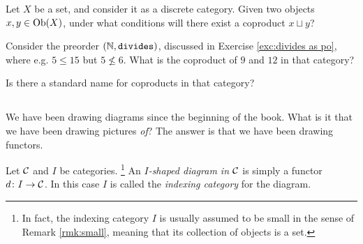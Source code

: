 \documentclass[CT4S-EN-RU]{subfiles}
\begin{document}
\begin{exerciseRUS}
\end{exerciseRUS}

\begin{exerciseENG}
Let $X$ be a set, and consider it as a discrete category. Given two objects $x,y\in\textnormal{Ob}(X)$, under what conditions will there exist a coproduct $x\sqcup y$?
\end{exerciseENG}

\begin{exerciseRUS}
\end{exerciseRUS}

\begin{exerciseENG}
Consider the preorder $({\mathbb N},{\tt divides})$, discussed in Exercise \ref{exc:divides as po}, where e.g. $5\leq 15$ but $5\not\leq 6$. \sexc What is the coproduct of $9$ and $12$ in that category?
\item Is there a standard name for coproducts in that category?
\endsexc
\end{exerciseENG}

\begin{exerciseRUS}
\end{exerciseRUS}


\subsection{}\label{sec:diagrams in a category}

\begin{blockENG}
We have been drawing diagrams since the beginning of the book. What is it that we have been drawing pictures {\em of}? The answer is that we have been drawing functors.
\end{blockENG}

\begin{blockRUS}
\end{blockRUS}

\begin{definition}
Let $\mathcal{C}$ and $I$ be categories.
\footnote{In fact, the indexing category $I$ is usually assumed to be small in the sense of Remark \ref{rmk:small}, meaning that its collection of objects is a set.}
An {\em $I$-shaped diagram in $\mathcal{C}$} is simply a functor $d\colon I\rightarrow\mathcal{C}$. In this case $I$ is called the {\em indexing category} for the diagram.
\end{definition}
\end{document}

